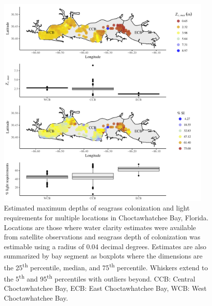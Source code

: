 \documentclass[letterpaper,12pt,oneside]{article}\usepackage[]{graphicx}\usepackage[]{color}
\begin{document}
\begin{figure}
\centering
\includegraphics[width = 0.95\textwidth]{figs/FigS1.pdf}
\caption{Estimated maximum depths of seagrass colonization and light requirements for multiple locations in Choctawhatchee Bay, Florida. Locations are those where water clarity estimates were available from satellite observations and seagrass depth of colonization was estimable using a radius of 0.04 decimal degrees.  Estimates are also summarized by bay segment as boxplots where the dimensions are the 25\textsuperscript{th} percentile, median, and 75\textsuperscript{th} percentile.  Whiskers extend to the 5\textsuperscript{th} and 95\textsuperscript{th} percentiles with outliers beyond. CCB: Central Choctawhatchee Bay, ECB: East Choctawhatchee Bay, WCB: West Choctawhatchee Bay.}
\label{fig:light_choc_zcmax}
\end{figure}

\end{document}
